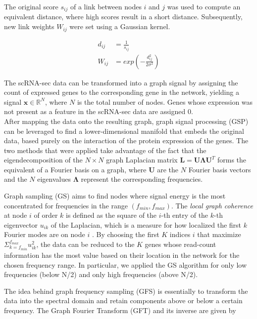 \documentclass[10pt,conference,compsocconf]{IEEEtran}
\begin{document}
The original score $s_{ij}$ of a link between nodes $i$ and $j$ was used to compute an equivalent distance, where high scores result in a short distance. Subsequently, new link weights $W_{ij}$ were set using a Gaussian kernel.

\begin{align}
d_{ij} &= \frac{1}{s_{ij}} \\
W_{ij} &= exp (- \frac{d_{ij}^2}{2 \sigma^2})
\end{align}
\par

The scRNA-sec data can be transformed into a graph signal by assigning the count of expressed genes to the corresponding gene in the network, yielding a signal $\boldsymbol{x} \in \mathbb{R}^N$, where $N$ is the total number of nodes. Genes whose expression was not present as a feature in the scRNA-sec data are assigned 0. \\
After mapping the data onto the resulting graph, graph signal processing (GSP) can be leveraged to find a lower-dimensional manifold that embeds the original data, based purely on the interaction of the protein expression of the genes. The two methods that were applied take advantage of the fact that the eigendecomposition of the $N \times N$ graph Laplacian matrix $\boldsymbol{L} = \boldsymbol{U\Lambda U}^T$ forms the equivalent of a Fourier basis on a graph, where $\boldsymbol{U}$ are the $N$ Fourier basis vectors and the $N$ eigenvalues $\boldsymbol{\Lambda}$ represent the corresponding frequencies.
 \par
Graph sampling (GS) aims to find nodes where signal energy is the most concentrated for frequencies in the range $(f_{min}, f_{max})$. The \textit{local graph coherence} at node $i$ of order $k$ is defined as the square of the $i$-th entry of the $k$-th eigenvector $u_{ik}$ of the Laplacian, which is a measure for how localized the first $k$ Fourier modes are on node $i$ \cite{Puy2018}. By choosing the first $K$ indices $i$ that maximize $\Sigma_{k=f_{min}}^{f_{max}} u_{ik}^2$, the data can be reduced to the $K$ genes whose read-count information has the most value based on their location in the network for the chosen frequency range. In particular, we applied the GS algorithm for only low frequencies (below N/2) and only high frequencies (above N/2). 
\par
The idea behind graph frequency sampling (GFS) is essentially to transform the data into the spectral domain and retain components above or below a certain frequency. The Graph Fourier Transform (GFT) and its inverse are given by
\end{document}
